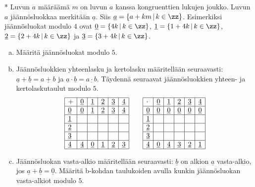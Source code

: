 \begin{kotitehtavasivu}
\begin{tehtava}
	* %
	Luvun $a$ määräämä  $m$ on luvun $a$ kanssa kongruenttien lukujen joukko. Luvun $a$ jäännösluokkaa merkitään $\underline{a}$. Siis $\underline{a} = \{a + km\, |\, k\in \zz\}$. Esimerkiksi jäännösluokat modulo $4$ ovat $\underline{0}=\{4k\, |\, k\in \zz\}$, $\underline{1}=\{1+4k\, |\, k\in \zz\}$, $\underline{2}=\{2+4k\, |\, k\in \zz\}$ ja $\underline{3}=\{3+4k\, |\, k\in \zz\}$.
	\begin{enumerate}[a)]
	\item Määritä jäännösluokat modulo $5$.
	\item Jäännösluokkien yhteenlasku ja kertolasku määritellään seuraavasti: $\underline{a} + \underline{b} = \underline{a + b}$ ja $\underline{a} \cdot \underline{b} = \underline{a\cdot b}$. Täydennä seuraavat jäännösluokkien yhteen- ja kertolaskutaulut modulo $5$.
	\[
	\begin{array}{|l|l|l|l|l|l|}
	\hline
	+& \underline{0} & \underline{1} & \underline{2} & \underline{3} & \underline{4} \\ \hline
	\underline{0} & \underline{0} & \underline{1} & \underline{2} &  \underline{3} & \underline{4}  
	\\ \hline
	 \underline{1} &&&&& \\ \hline
	 \underline{2} &&&&& \\ \hline
	 \underline{3} &&&&& \\ \hline
	\underline{4} & \underline{4} & \underline{0} & \underline{1} &  \underline{2} & \underline{3}  
	\\ \hline
	\end{array}
	\qquad
	\begin{array}{|l|l|l|l|l|l|}
	\hline
	\cdot& \underline{0} & \underline{1} & \underline{2} & \underline{3} & \underline{4} \\ \hline
	\underline{0} & \underline{0} & \underline{0} & \underline{0} &  \underline{0} & \underline{0}  
	\\ \hline
	 \underline{1} &&&&& \\ \hline
	 \underline{2} &&&&& \\ \hline
	 \underline{3} &&&&& \\ \hline
	\underline{4} & \underline{0} & \underline{4} & \underline{3} &  \underline{2} & \underline{1}  
	\\ \hline
	\end{array}
	\]
	\item Jäännösluokan vasta-alkio määritellään seuraavasti: $\underline{b}$ on alkion $\underline{a}$ vasta-alkio, jos $\underline{a} + \underline{b} = \underline{0}$. Määritä b-kohdan  taulukoiden avulla kunkin jäännösluokan vasta-alkiot modulo $5$.

\end{enumerate}
\end{tehtava}
\end{kotitehtavasivu}
